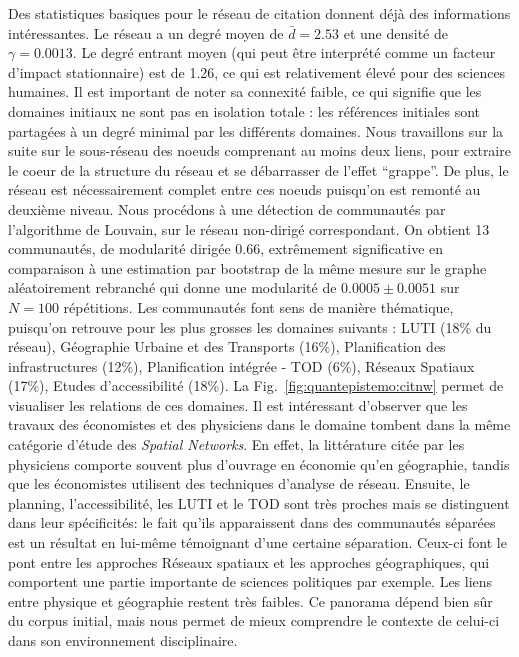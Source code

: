 Des statistiques basiques pour le réseau de citation donnent déjà des informations intéressantes. Le réseau a un degré moyen de $\bar{d}=2.53$ et une densité de $\gamma=0.0013$. Le degré entrant moyen (qui peut être interprété comme un facteur d'impact stationnaire) est de 1.26, ce qui est relativement élevé pour des sciences humaines. Il est important de noter sa connexité faible, ce qui signifie que les domaines initiaux ne sont pas en isolation totale : les références initiales sont partagées à un degré minimal par les différents domaines. Nous travaillons sur la suite sur le sous-réseau des noeuds comprenant au moins deux liens, pour extraire le coeur de la structure du réseau et se débarrasser de l'effet ``grappe''. De plus, le réseau est nécessairement complet entre ces noeuds puisqu'on est remonté au deuxième niveau. Nous procédons à une détection de communautés par l'algorithme de Louvain, sur le réseau non-dirigé correspondant. On obtient 13 communautés, de modularité dirigée 0.66, extrêmement significative en comparaison à une estimation par bootstrap de la même mesure sur le graphe aléatoirement rebranché qui donne une modularité de $0.0005 \pm 0.0051$ sur $N=100$ répétitions. Les communautés font sens de manière thématique, puisqu'on retrouve pour les plus grosses les domaines suivants : LUTI (18\% du réseau), Géographie Urbaine et des Transports (16\%), Planification des infrastructures (12\%), Planification intégrée - TOD (6\%), Réseaux Spatiaux (17\%), Etudes d'accessibilité (18\%). La Fig.~\ref{fig:quantepistemo:citnw} permet de visualiser les relations de ces domaines. Il est intéressant d'observer que les travaux des économistes et des physiciens dans le domaine tombent dans la même catégorie d'étude des \emph{Spatial Networks}. En effet, la littérature citée par les physiciens comporte souvent plus d'ouvrage en économie qu'en géographie, tandis que les économistes utilisent des techniques d'analyse de réseau. Ensuite, le planning, l'accessibilité, les LUTI et le TOD sont très proches mais se distinguent dans leur spécificités: le fait qu'ils apparaissent dans des communautés séparées est un résultat en lui-même témoignant d'une certaine séparation. Ceux-ci font le pont entre les approches Réseaux spatiaux et les approches géographiques, qui comportent une partie importante de sciences politiques par exemple. Les liens entre physique et géographie restent très faibles. Ce panorama dépend bien sûr du corpus initial, mais nous permet de mieux comprendre le contexte de celui-ci dans son environnement disciplinaire.


